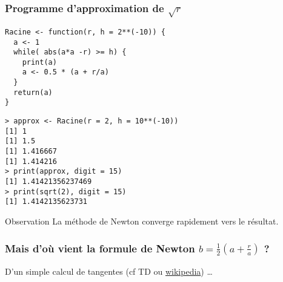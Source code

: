 \documentclass[10pt]{beamer}
\begin{document}
\begin{frame}[fragile]
  \frametitle{Programme d'approximation de $\sqrt{r}$}
  \begin{lstlisting}[style=editor]
Racine <- function(r, h = 2**(-10)) {
  a <- 1
  while( abs(a*a -r) >= h) {
    print(a)
    a <- 0.5 * (a + r/a)
  }
  return(a)
}
\end{lstlisting}

\begin{lstlisting}
> approx <- Racine(r = 2, h = 10**(-10))
[1] 1
[1] 1.5
[1] 1.416667
[1] 1.414216
> print(approx, digit = 15)
[1] 1.41421356237469
> print(sqrt(2), digit = 15)
[1] 1.4142135623731
\end{lstlisting}

\begin{block}{Observation}
  La méthode de Newton converge rapidement vers le résultat.
\end{block}
\end{frame}

\begin{frame}
  \frametitle{Mais d'où vient la formule de Newton  $b = \frac{1}{2}(a + \frac{r}{a})$ ?}

  D'un simple calcul de tangentes (cf TD ou \href{https://fr.wikipedia.org/wiki/M\%C3\%A9thode\_de\_Newton}{wikipedia}) \dots

  \begin{center}
  \end{center}
\end{frame}
\end{document}
